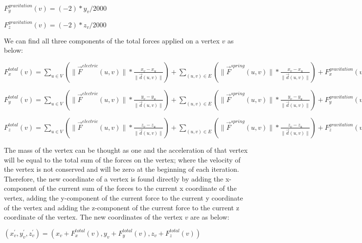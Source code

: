 \documentclass[a4paper]{article}
\begin{document}
\begin{center}
\begin{math}
F_y^{gravitation}(v)=(-2)*y_v/2000
\end{math}
\end{center}
\begin{center}
\begin{math}
F_z^{gravitation}(v)=(-2)*z_v/2000
\end{math}
\end{center}
We can find all three components of the total forces applied on a vertex $v$ as below: 
\begin{center}
\begin{math}
F_x^{total}(v)=\displaystyle\sum_{u \in V}\left(\|\vec{F}^{electric}(u,v)\|*\frac{x_v-x_u}{\|\vec{d}(u,v)\|}\right)+\displaystyle\sum_{(u,v) \in E}\left(\|\vec{F}^{spring}(u,v)\|*\frac{x_v-x_u}{\|\vec{d}(u,v)\|}\right)+F_x^{gravitation}(v)
\end{math}
\end{center}
\begin{center}
\begin{math}
F_y^{total}(v)=\displaystyle\sum_{u \in V}\left(\|\vec{F}^{electric}(u,v)\|*\frac{y_v-y_u}{\|\vec{d}(u,v)\|}\right)+\displaystyle\sum_{(u,v) \in E}\left(\|\vec{F}^{spring}(u,v)\|*\frac{y_v-y_u}{\|\vec{d}(u,v)\|}\right)+F_y^{gravitation}(v)
\end{math}
\end{center}
\begin{center}
\begin{math}
F_z^{total}(v)=\displaystyle\sum_{u \in V}\left(\|\vec{F}^{electric}(u,v)\|*\frac{z_v-z_u}{\|\vec{d}(u,v)\|}\right)+\displaystyle\sum_{(u,v) \in E}\left(\|\vec{F}^{spring}(u,v)\|*\frac{z_v-z_u}{\|\vec{d}(u,v)\|}\right)+F_z^{gravitation}(v)
\end{math}
\end{center}
The mass of the vertex can be thought as one and the acceleration of that vertex will be equal to the total sum of the forces on the vertex; where the velocity of the vertex is not conserved and will be zero at the beginning of each iteration. Therefore, the new coordinate of a vertex is found directly by adding the x-component of the current sum of the forces to the current x coordinate of the vertex, adding the y-component of the current force to the current y coordinate of the vertex and adding the z-component of the current force to the current z coordinate of the vertex. The new coordinates of the vertex $v$ are as below:
\begin{center}
\begin{math}
(x_v^{'}, y_v^{'}, z_v^{'}) = (x_v+F_x^{total}(v), y_v+F_y^{total}(v), z_v+F_z^{total}(v))
\end{math}
\end{center}
\end{document}
